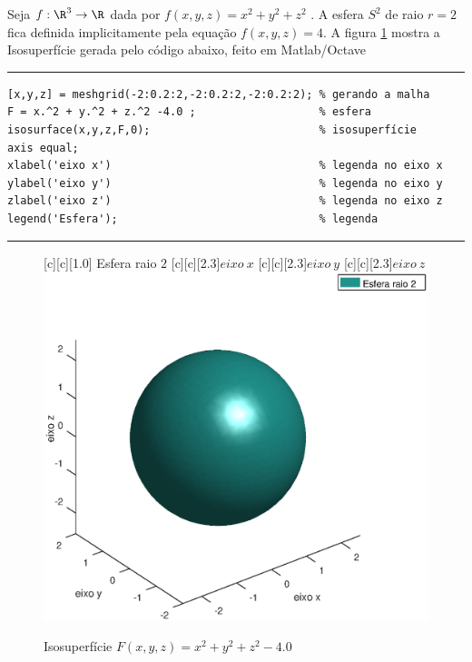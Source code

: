  Seja $f:\R^3 \rightarrow \R$ dada por $f(x, y, z) = x^2 + y^2 + z^2$ . A esfera {$S^2$} de raio $r=2$ fica definida implicitamente pela equação $f(x,y,z) = 4$. A figura \ref{fig.esfera} mostra a Isosuperfície gerada pelo código abaixo, feito em Matlab/Octave

\begin{Codigo}[htpb]
\noindent\rule{13cm}{1.pt}
\begin{verbatim}
[x,y,z] = meshgrid(-2:0.2:2,-2:0.2:2,-2:0.2:2); % gerando a malha
F = x.^2 + y.^2 + z.^2 -4.0 ;                   % esfera 
isosurface(x,y,z,F,0);                          % isosuperfície
axis equal;
xlabel('eixo x')                                % legenda no eixo x
ylabel('eixo y')                                % legenda no eixo y
zlabel('eixo z')                                % legenda no eixo z
legend('Esfera');                               % legenda
\end{verbatim}
\caption{Código utilizado para gerar a figura \ref{fig.esfera}} 
\noindent\rule{13cm}{1.pt}
\label{esfera}
\end{Codigo}


\begin{figure}[htpb]
\begin{center} 
[c][c][1.0]{\hspace{0.25cm} Esfera raio $2$}
[c][c][2.3]{$eixo \ x$}
[c][c][2.3]{$eixo \ y$}
[c][c][2.3]{$eixo \ z$}
\includegraphics*[angle=0,scale=0.5]{imagens/cap2/esfera_isosurf.eps} 
\caption{Isosuperfície $F(x,y,z)=x^2+y^2+z^2-4.0$} 
\label{fig.esfera}
\end{center}
\end{figure}


